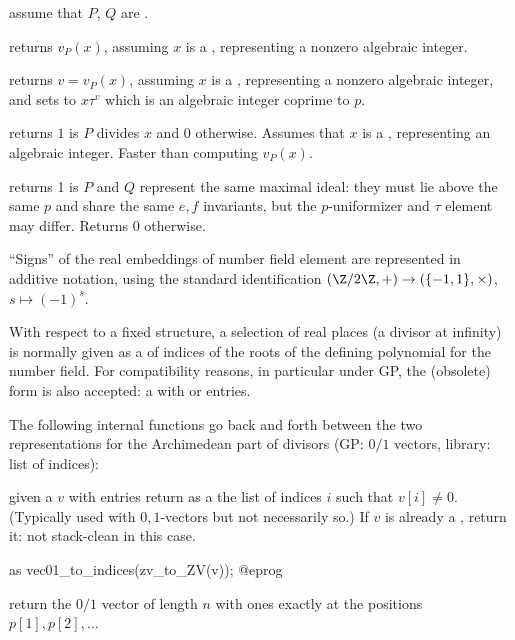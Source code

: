  assume that $P$, $Q$ are .

 returns $v_P(x)$,
assuming $x$ is a , representing a nonzero algebraic integer.

 returns $v = v_P(x)$,
assuming $x$ is a , representing a nonzero algebraic integer, and sets
 to $x\tau^v$ which is an algebraic integer coprime to $p$.

 returns $1$ is $P$ divides $x$ and
$0$ otherwise. Assumes that $x$ is a , representing an algebraic
integer. Faster than computing $v_P(x)$.

 returns 1 is $P$ and $Q$ represent
the same maximal ideal: they must lie above the same $p$ and share the same
$e,f$ invariants, but the $p$-uniformizer and $\tau$ element may differ.
Returns $0$ otherwise.

\label{se:signatures}

``Signs'' of the real embeddings of number field element are represented in
additive notation, using the standard identification $(\Z/2\Z, +) \to
(\{-1,1\},\times)$, $s\mapsto (-1)^s$.

With respect to a fixed  structure, a selection of real places (a
divisor at infinity) is normally given as a  of indices of the
roots  of the defining polynomial for the number field. For
compatibility reasons, in particular under GP, the (obsolete) 
form is also accepted: a  with  or  entries.

The following internal functions go back and forth between the two
representations for the Archimedean part of divisors (GP: $0/1$ vectors,
library: list of indices):

 given a  $v$ with  entries
return as a  the list of indices $i$ such that $v[i] \neq 0$.
(Typically used with $0,1$-vectors but not necessarily so.) If $v$ is already
a , return it: not stack-clean in this case.

 as
\bprog
  vec01_to_indices(zv_to_ZV(v));
@eprog

 return the $0/1$ vector of length
$n$ with ones exactly at the positions $p[1], p[2], \ldots$

